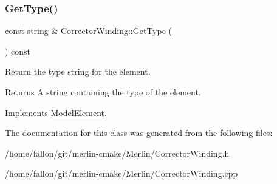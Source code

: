 \subsubsection{\texorpdfstring{Get\+Type()}{GetType()}}
{\footnotesize\ttfamily const string \& Corrector\+Winding\+::\+Get\+Type (\begin{DoxyParamCaption}{ }\end{DoxyParamCaption}) const\hspace{0.3cm}{\ttfamily [virtual]}}

Return the type string for the element. \begin{DoxyReturn}{Returns}
A string containing the type of the element. 
\end{DoxyReturn}


Implements \hyperlink{classModelElement_a04dc2e51e1999fca612eb1838ec6b271}{Model\+Element}.



The documentation for this class was generated from the following files\+:\begin{DoxyCompactItemize}
\item 
/home/fallon/git/merlin-\/cmake/\+Merlin/Corrector\+Winding.\+h\item 
/home/fallon/git/merlin-\/cmake/\+Merlin/Corrector\+Winding.\+cpp\end{DoxyCompactItemize}
